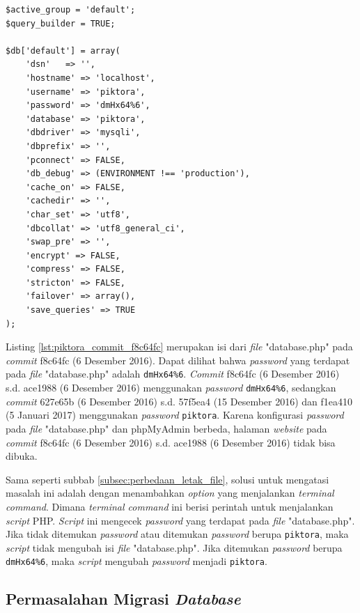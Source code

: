 \begin{lstlisting}[caption={Isi \textit{file} "database.php" pada \textit{commit} f8c64fc(6 Desember 2016)},label={lst:piktora_commit_f8c64fc},language=plaintext]
$active_group = 'default';
$query_builder = TRUE;

$db['default'] = array(
	'dsn'	=> '',
	'hostname' => 'localhost',
	'username' => 'piktora',
	'password' => 'dmHx64%6',
	'database' => 'piktora',
	'dbdriver' => 'mysqli',
	'dbprefix' => '',
	'pconnect' => FALSE,
	'db_debug' => (ENVIRONMENT !== 'production'),
	'cache_on' => FALSE,
	'cachedir' => '',
	'char_set' => 'utf8',
	'dbcollat' => 'utf8_general_ci',
	'swap_pre' => '',
	'encrypt' => FALSE,
	'compress' => FALSE,
	'stricton' => FALSE,
	'failover' => array(),
	'save_queries' => TRUE
);
\end{lstlisting}

Listing \ref{lst:piktora_commit_f8c64fc} merupakan isi dari \textit{file} "database.php" pada \textit{commit} f8c64fc (6 Desember 2016). Dapat dilihat bahwa \textit{password} yang terdapat pada \textit{file} "database.php" adalah \texttt{dmHx64\%6}. \textit{Commit} f8c64fc (6 Desember 2016) s.d. ace1988 (6 Desember 2016) menggunakan \textit{password} \texttt{dmHx64\%6}, sedangkan \textit{commit} 627e65b (6 Desember 2016) s.d. 57f5ea4 (15 Desember 2016) dan f1ea410 (5 Januari 2017) menggunakan \textit{password} \texttt{piktora}. Karena konfigurasi \textit{password} pada \textit{file} "database.php" dan phpMyAdmin berbeda, halaman \textit{website} pada \textit{commit} f8c64fc (6 Desember 2016) s.d. ace1988 (6 Desember 2016) tidak bisa dibuka. 

Sama seperti subbab \ref{subsec:perbedaan_letak_file}, solusi untuk mengatasi masalah ini adalah dengan menambahkan \textit{option} yang menjalankan \textit{terminal command}. Dimana \textit{terminal command} ini berisi perintah untuk menjalankan \textit{script} PHP. \textit{Script} ini mengecek \textit{password} yang terdapat pada \textit{file} "database.php". Jika tidak ditemukan \textit{password} atau ditemukan \textit{password} berupa \texttt{piktora}, maka \textit{script} tidak mengubah isi \textit{file} "database.php". Jika ditemukan \textit{password} berupa \texttt{dmHx64\%6}, maka \textit{script} mengubah \textit{password} menjadi \texttt{piktora}. 

\subsection{Permasalahan Migrasi \textit{Database}}
\label{subsec:migrasi_database}

